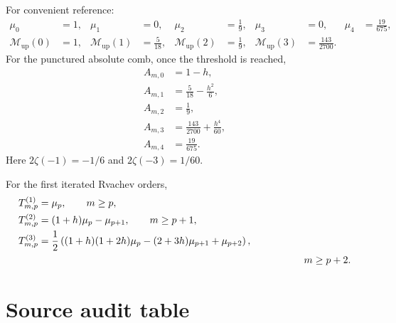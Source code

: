 \documentclass[11pt]{article}
\theoremstyle{definition}
\newcommand{\Up}{\operatorname{up}}
\newcommand{\Mell}{\mathcal{M}}
\begin{document}
For convenient reference:
\begin{align*}
 \mu_0&=1,&
 \mu_1&=0,&
 \mu_2&=\frac19,&
 \mu_3&=0,&
 \mu_4&=\frac{19}{675},\\
 \Mell_{\Up}(0)&=1,&
 \Mell_{\Up}(1)&=\frac5{18},&
 \Mell_{\Up}(2)&=\frac19,&
 \Mell_{\Up}(3)&=\frac{143}{2700}.&&
\end{align*}
For the punctured absolute comb, once the threshold is reached,
\begin{align*}
 A_{m,0}&=1-h,\\
 A_{m,1}&=\frac5{18}-\frac{h^2}{6},\\
 A_{m,2}&=\frac19,\\
 A_{m,3}&=\frac{143}{2700}+\frac{h^4}{60},\\
 A_{m,4}&=\frac{19}{675}.
\end{align*}
Here $2\zeta(-1)=-1/6$ and $2\zeta(-3)=1/60$.

For the first iterated Rvachev orders,
\begin{align*}
 T_{m,p}^{(1)}&=\mu_p,\qquad m\ge p,\\
 T_{m,p}^{(2)}&=(1+h)\mu_p-\mu_{p+1},\qquad m\ge p+1,\\
 T_{m,p}^{(3)}&=\frac12\left((1+h)(1+2h)\mu_p
 -(2+3h)\mu_{p+1}+\mu_{p+2}\right),\\
 &\hspace{9.4cm}m\ge p+2.
\end{align*}

\section{Source audit table}
\end{document}
